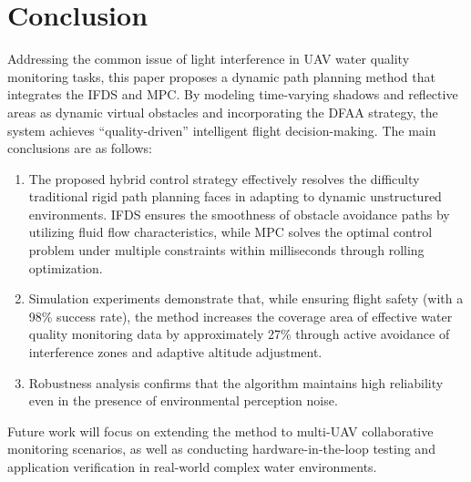 \documentclass[final,3p,times,numbers]{elsarticle}
\begin{document}
\section{Conclusion}
Addressing the common issue of light interference in UAV water quality monitoring tasks, this paper proposes a dynamic path planning method that integrates the IFDS and MPC. By modeling time-varying shadows and reflective areas as dynamic virtual obstacles and incorporating the DFAA strategy, the system achieves ``quality-driven'' intelligent flight decision-making. The main conclusions are as follows:

\begin{enumerate}
    \item The proposed hybrid control strategy effectively resolves the difficulty traditional rigid path planning faces in adapting to dynamic unstructured environments. IFDS ensures the smoothness of obstacle avoidance paths by utilizing fluid flow characteristics, while MPC solves the optimal control problem under multiple constraints within milliseconds through rolling optimization.
    \item Simulation experiments demonstrate that, while ensuring flight safety (with a 98\% success rate), the method increases the coverage area of effective water quality monitoring data by approximately 27\% through active avoidance of interference zones and adaptive altitude adjustment.
    \item Robustness analysis confirms that the algorithm maintains high reliability even in the presence of environmental perception noise.
\end{enumerate}

Future work will focus on extending the method to multi-UAV collaborative monitoring scenarios, as well as conducting hardware-in-the-loop testing and application verification in real-world complex water environments.








\end{document}
